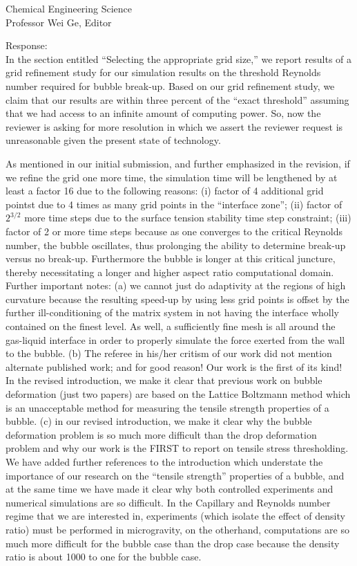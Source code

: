 \documentclass{letter}
\begin{document}
\begin{letter}{
Chemical Engineering Science\\
Professor Wei Ge, Editor\\}
\begin{enumerate}
Response: \\
In the section entitled ``Selecting the appropriate grid size,'' we 
report results of a grid refinement study for our simulation results on
the threshold Reynolds number required for bubble break-up.  Based on
our grid refinement study, we claim that our results are within three
percent of the ``exact threshold'' assuming that we had access to an
infinite amount of computing power.  So, now the reviewer is asking for
more resolution in which we assert the reviewer request is 
unreasonable given the present state of technology.

As mentioned in our initial submission, and further emphasized in the revision,
if we refine the grid one more time, the simulation time will be 
lengthened by at least a factor 16 due to the following reasons:
(i) factor of 4 additional grid pointst 
due to 4 times as many grid points in the ``interface zone''; (ii) factor of $2^{3/2}$
more time steps due to the surface tension stability time step constraint; (iii) factor of 2 or more time steps because as one converges to the critical Reynolds number, the bubble oscillates, thus prolonging the ability to determine break-up versus no break-up.  Furthermore the bubble is longer at this critical juncture, thereby necessitating a longer and higher aspect ratio computational domain.  Further important notes: (a) we cannot just do adaptivity at the regions of high curvature because the resulting speed-up by using less grid points is offset by the further ill-conditioning of the matrix system in not having the interface wholly contained on the finest level.  As well, a sufficiently fine mesh is all around the gas-liquid interface in order to properly simulate the force exerted from the wall to the bubble. (b) The referee in his/her critism of our work did not mention alternate published work; and for good reason! Our work is the first of its kind! In the revised introduction, we make it clear that previous work on bubble deformation (just two papers) are based on the Lattice Boltzmann method which is an unacceptable method for measuring the tensile strength properties of a bubble.   (c) in our revised introduction, we make it clear why the bubble deformation problem is so much more difficult than the drop deformation problem and why our work is the FIRST to report on
tensile stress thresholding.  We have added further references to the introduction which understate the importance of our research on the ``tensile strength'' properties of a bubble, and at the same time we have made it clear why both controlled experiments and numerical simulations are so difficult.  In the Capillary and Reynolds number regime that we are interested in, experiments (which isolate the effect of density ratio) must be performed in microgravity, on the otherhand, computations are so much more difficult for the bubble case than the drop case because the density ratio is about 
1000 to one for the bubble case.


\end{enumerate}
\end{letter}
\end{document}
